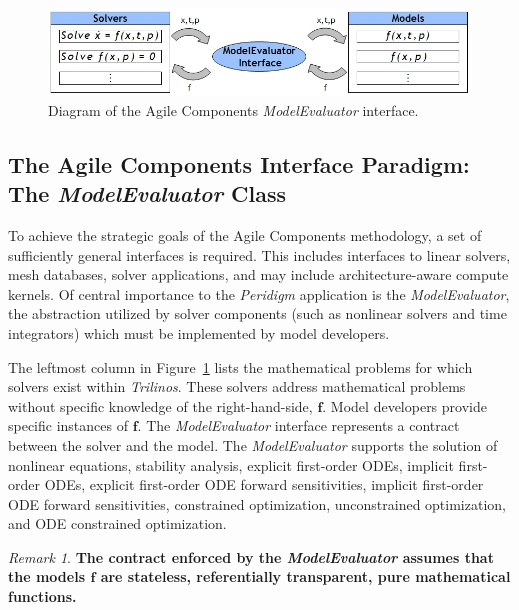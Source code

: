 \documentclass[pdf,ps2pdf,12pt,report]{SANDreport}
\theoremstyle{plain}
\theoremstyle{definition}
\theoremstyle{remark}
\newtheorem{rem}{Remark}[section]
\numberwithin{equation}{section}
\begin{document}
\begin{figure}[htbp]
\begin{center}
	\includegraphics[width=\linewidth]{ModelEvaluatorInterface}
 \end{center}
 \caption{Diagram of the Agile Components \emph{ModelEvaluator} interface.}
\label{fig:ACModelEvaluator}
\end{figure}

\subsection{The Agile Components Interface Paradigm: The \emph{ModelEvaluator} Class}


To achieve the strategic goals of the Agile Components methodology, a set of sufficiently general interfaces is required. This includes interfaces to linear solvers, mesh databases, solver applications, and may include architecture-aware compute kernels. Of central importance to the \emph{Peridigm} application is the \emph{ModelEvaluator}, the abstraction utilized by solver components (such as nonlinear solvers and time integrators) which must be implemented by model developers.

The leftmost column in Figure~\ref{fig:ACModelEvaluator} lists the mathematical problems for which solvers exist within \emph{Trilinos}. These solvers address mathematical problems without specific knowledge of the right-hand-side, $\mathbf{f}$. Model developers provide specific instances of $\mathbf{f}$. The \emph{ModelEvaluator} interface represents a contract between the solver and the model. The \emph{ModelEvaluator} supports the solution of nonlinear equations, stability analysis, explicit first-order ODEs, implicit first-order ODEs, explicit first-order ODE forward sensitivities, implicit first-order ODE forward sensitivities, constrained optimization, unconstrained optimization, and ODE constrained optimization.

\begin{rem} \label{rem:MEContract}
\textbf{The contract enforced by the \emph{ModelEvaluator} assumes that the models $\mathbf{f}$ are stateless, referentially transparent, pure mathematical functions.}
\end{rem}
\end{document}
